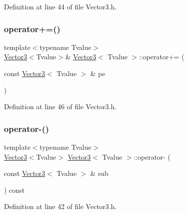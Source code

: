 Definition at line 44 of file Vector3.\+h.

\mbox{\label{class_vector3_a3e7c9473344707d60601964a20d73089}} 
\subsubsection{\texorpdfstring{operator+=()}{operator+=()}}
{\footnotesize\ttfamily template$<$typename Tvalue$>$ \\
\hyperlink{class_vector3}{Vector3}$<$Tvalue$>$\& \hyperlink{class_vector3}{Vector3}$<$ Tvalue $>$\+::operator+= (\begin{DoxyParamCaption}\item[{const \hyperlink{class_vector3}{Vector3}$<$ Tvalue $>$ \&}]{pe }\end{DoxyParamCaption})\hspace{0.3cm}{\ttfamily [inline]}}



Definition at line 46 of file Vector3.\+h.

\mbox{\label{class_vector3_a1ffdb538fbdeb746c34d10ccb0481691}} 
\subsubsection{\texorpdfstring{operator-\/()}{operator-()}\hspace{0.1cm}{\footnotesize\ttfamily [1/2]}}
{\footnotesize\ttfamily template$<$typename Tvalue$>$ \\
\hyperlink{class_vector3}{Vector3}$<$Tvalue$>$ \hyperlink{class_vector3}{Vector3}$<$ Tvalue $>$\+::operator-\/ (\begin{DoxyParamCaption}\item[{const \hyperlink{class_vector3}{Vector3}$<$ Tvalue $>$ \&}]{sub }\end{DoxyParamCaption}) const\hspace{0.3cm}{\ttfamily [inline]}}



Definition at line 42 of file Vector3.\+h.

\mbox{\label{class_vector3_a40dd7f0f2060b7ace809dd64fe768a35}} 
